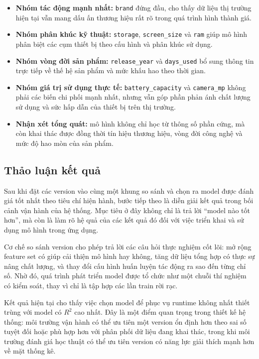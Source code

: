 \begin{itemize}
    \item \textbf{Nhóm tác động mạnh nhất:} \texttt{brand} đứng đầu, cho thấy dữ liệu thị trường hiện tại vẫn mang dấu ấn thương hiệu rất rõ trong quá trình hình thành giá.
    \item \textbf{Nhóm phân khúc kỹ thuật:} \texttt{storage}, \texttt{screen\_size} và \texttt{ram} giúp mô hình phân biệt các cụm thiết bị theo cấu hình và phân khúc sử dụng.
    \item \textbf{Nhóm vòng đời sản phẩm:} \texttt{release\_year} và \texttt{days\_used} bổ sung thông tin trực tiếp về thế hệ sản phẩm và mức khấu hao theo thời gian.
    \item \textbf{Nhóm giá trị sử dụng thực tế:} \texttt{battery\_capacity} và \texttt{camera\_mp} không phải các biến chi phối mạnh nhất, nhưng vẫn góp phần phản ánh chất lượng sử dụng và sức hấp dẫn của thiết bị trên thị trường.
    \item \textbf{Nhận xét tổng quát:} mô hình không chỉ học từ thông số phần cứng, mà còn khai thác được đồng thời tín hiệu thương hiệu, vòng đời công nghệ và mức độ hao mòn của sản phẩm.
\end{itemize}

\subsection{Thảo luận kết quả}

Sau khi đặt các version vào cùng một khung so sánh và chọn ra model được đánh giá tốt nhất theo tiêu chí hiện hành, bước tiếp theo là diễn giải kết quả trong bối cảnh vận hành của hệ thống. Mục tiêu ở đây không chỉ là trả lời ``model nào tốt hơn'', mà còn là làm rõ hệ quả của các kết quả đó đối với việc triển khai và sử dụng mô hình trong ứng dụng.


Cơ chế so sánh version cho phép trả lời các câu hỏi thực nghiệm cốt lõi: mở rộng feature set có giúp cải thiện mô hình hay không, tăng dữ liệu tổng hợp có thực sự nâng chất lượng, và thay đổi cấu hình huấn luyện tác động ra sao đến từng chỉ số. Nhờ đó, quá trình phát triển model được tổ chức như một chuỗi thí nghiệm có kiểm soát, thay vì chỉ là tập hợp các lần train rời rạc.


Kết quả hiện tại cho thấy việc chọn model để phục vụ runtime không nhất thiết trùng với model có $R^2$ cao nhất. Đây là một điểm quan trọng trong thiết kế hệ thống: môi trường vận hành có thể ưu tiên một version ổn định hơn theo sai số tuyệt đối hoặc phù hợp hơn với phân phối dữ liệu đang khai thác, trong khi môi trường đánh giá học thuật có thể ưu tiên version có năng lực giải thích mạnh hơn về mặt thống kê.

